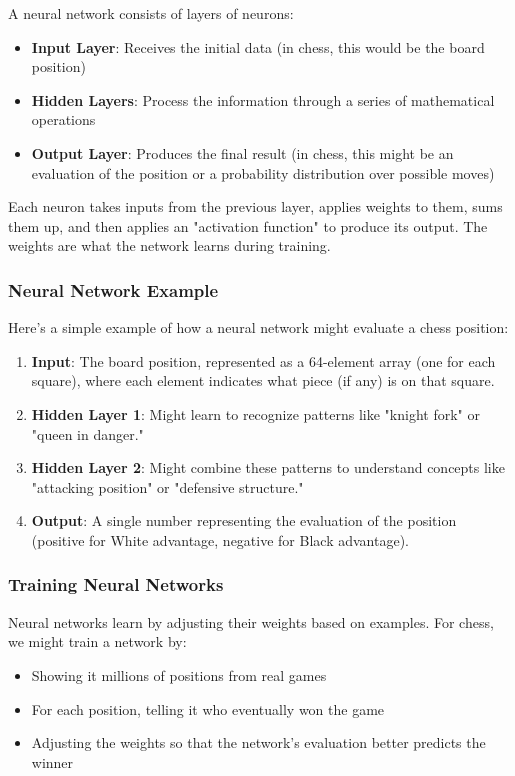 \documentclass[11pt]{article}
\begin{document}
A neural network consists of layers of neurons:
\begin{itemize}
    \item \textbf{Input Layer}: Receives the initial data (in chess, this would be the board position)
    \item \textbf{Hidden Layers}: Process the information through a series of mathematical operations
    \item \textbf{Output Layer}: Produces the final result (in chess, this might be an evaluation of the position or a probability distribution over possible moves)
\end{itemize}

Each neuron takes inputs from the previous layer, applies weights to them, sums them up, and then applies an "activation function" to produce its output. The weights are what the network learns during training.

\subsubsection{Neural Network Example}

Here's a simple example of how a neural network might evaluate a chess position:

\begin{enumerate}
    \item \textbf{Input}: The board position, represented as a 64-element array (one for each square), where each element indicates what piece (if any) is on that square.

    \item \textbf{Hidden Layer 1}: Might learn to recognize patterns like "knight fork" or "queen in danger."

    \item \textbf{Hidden Layer 2}: Might combine these patterns to understand concepts like "attacking position" or "defensive structure."

    \item \textbf{Output}: A single number representing the evaluation of the position (positive for White advantage, negative for Black advantage).
\end{enumerate}

\subsubsection{Training Neural Networks}

Neural networks learn by adjusting their weights based on examples. For chess, we might train a network by:
\begin{itemize}
    \item Showing it millions of positions from real games
    \item For each position, telling it who eventually won the game
    \item Adjusting the weights so that the network's evaluation better predicts the winner
\end{itemize}
\end{document}

